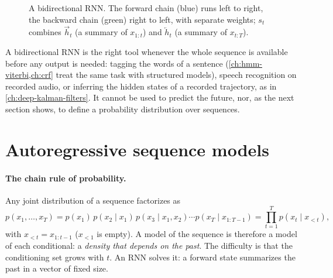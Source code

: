 \begin{notechapter}
\begin{figure}[ht]
\centering
{}
\caption{A bidirectional RNN. The forward chain (blue) runs left to right, the backward chain
(green) right to left, with separate weights; $s_t$ combines $\overrightarrow h_t$ (a summary of $x_{1:t}$) and $\overleftarrow h_t$ (a summary
of $x_{t:T}$).}
\label{sequence-models:fig:birnn}
\end{figure}

A bidirectional RNN is the right tool whenever the whole sequence is available before any
output is needed: tagging the words of a sentence (\cref{ch:hmm-viterbi,ch:crf} treat the
same task with structured models), speech recognition on recorded audio, or inferring the
hidden states of a recorded trajectory, as in \cref{ch:deep-kalman-filters}. It cannot be used to
predict the future, nor, as the next section shows, to define a probability distribution
over sequences.

\section{Autoregressive sequence models}\label{sequence-models:sec:autoregressive}

\paragraph{The chain rule of probability.} Any joint distribution of a sequence factorizes as
\[
  p(x_1,\dots,x_T) = p(x_1)\,p(x_2\mid x_1)\,p(x_3\mid x_1, x_2)\cdots p(x_T\mid x_{1:T-1}) = \prod_{t=1}^Tp(x_t\mid x_{<t}),
\]
with $x_{<t} = x_{1:t-1}$ ($x_{<1}$ is empty). A model of the sequence is therefore a model of each conditional: a
\emph{density that depends on the past}. The difficulty is that the conditioning set grows
with $t$. An RNN solves it: a forward state summarizes the past in a vector of fixed size.


\end{notechapter}
